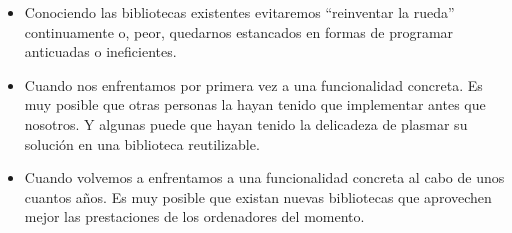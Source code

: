 \documentclass[spanish,12pt,a4paper,final,oneside]{book}
\begin{document}
\begin{itemize}

\item Conociendo las bibliotecas existentes evitaremos ``reinventar la rueda'' continuamente o, peor, quedarnos estancados en formas de programar anticuadas o ineficientes. 

\item Cuando nos enfrentamos por primera vez a una funcionalidad concreta. Es muy posible que otras personas la hayan tenido que implementar antes que nosotros. Y algunas puede que hayan tenido la delicadeza de plasmar su solución en una biblioteca reutilizable.

\item Cuando volvemos a enfrentamos a una funcionalidad concreta al cabo de unos cuantos años. Es muy posible que existan nuevas bibliotecas que aprovechen mejor las prestaciones de los ordenadores del momento.

\end{itemize}
\end{document}
